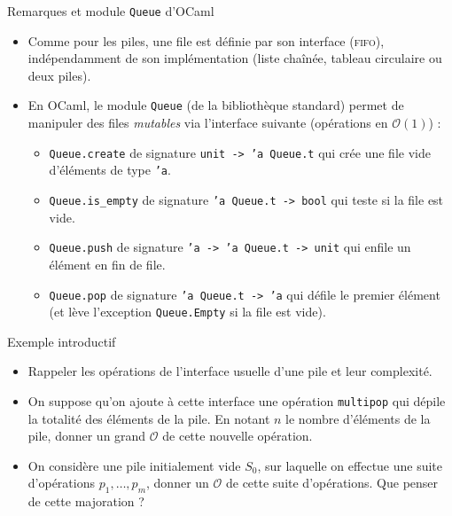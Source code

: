 \documentclass[10pt]{beamer}
\begin{document}
\begin{frame}{\Ctitle}{\stitle}
	\begin{block}{Remarques et module {\tt Queue} d'OCaml}
		\begin{itemize}
			\item {\small \textcolor{BrickRed}{\danger}} Comme pour les piles, une file est définie par son interface (\textsc{fifo}), indépendamment de son implémentation (liste chaînée, tableau circulaire ou deux piles).
			\item<2-> En OCaml, le module {\tt Queue} (de la bibliothèque standard) permet de manipuler des files \textit{mutables} via l'interface suivante (opérations en $\mathcal{O}(1)$) :
				\begin{itemize}
					\item<3-> \texttt{Queue.create} de signature {\tt unit -> 'a Queue.t} qui crée une file vide d'éléments de type {\tt 'a}.
					\item<4-> \texttt{Queue.is_empty} de signature {\tt 'a Queue.t -> bool} qui teste si la file est vide.
					\item<5-> \texttt{Queue.push} de signature {\tt 'a -> 'a Queue.t -> unit} qui enfile un élément en fin de file.
					\item<6-> \texttt{Queue.pop} de signature {\tt 'a Queue.t -> 'a} qui défile le premier élément (et lève l'exception {\tt Queue.Empty} si la file est vide).
				\end{itemize}
		\end{itemize}
	\end{block}
\end{frame}

\begin{frame}[fragile]{\Ctitle}{\stitle}
	\begin{exampleblock}{Exemple introductif}
		\begin{itemize}
		\item<1-> Rappeler les opérations de l'interface usuelle d'une pile et leur complexité.
		\item<2-> On suppose qu'on ajoute à cette interface une opération {\tt multipop} qui dépile la totalité des éléments de la pile. En notant $n$ le nombre d'éléments de la pile, donner un grand $\mathcal{O}$ de cette nouvelle opération.
		\item<3-> On considère une pile initialement vide $S_0$, sur laquelle on effectue une suite d'opérations $p_1,\dots, p_m$, donner un $\mathcal{O}$ de cette suite d'opérations. Que penser de cette majoration ?
		\end{itemize}
	\end{exampleblock}
\end{frame}
\end{document}
